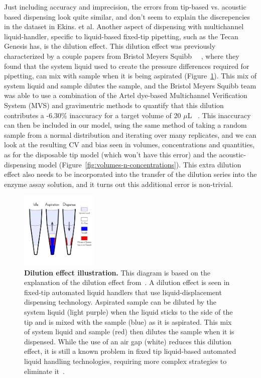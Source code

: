 \documentclass[aps,pre,twocolumn,nofootinbib,superscriptaddress,linenumbers]{revtex4-1}
\begin{document}
Just including accuracy and imprecision, the errors from tip-based vs. acoustic based dispensing look quite similar, and don't seem to explain the discrepencies in the dataset in Ekins. et al. 
Another aspect of dispensing with multichannel liquid-handler, specific to liquid-based fixed-tip pipetting, such as the Tecan Genesis has, is the dilution effect. 
This dilution effect was previously characterized by a couple papers from Bristol Meyers Squibb ~\cite{dong_use_2006}~\cite{gu_dilution_2007}, where they found that the system liquid used to create the pressure differences required for pipetting, can mix with sample when it is being aspirated (Figure~\ref{fig:dilution_effect}). 
This mix of system liquid and sample dilutes the sample, and the Bristol Meyers Squibb team was able to use a combination of the Artel dye-based Multichannel Verification System (MVS) and gravimentric methods to quantify that this dilution contributes a -6.30\% inaccuracy for a target volume of 20 $\mu$L ~\cite{dong_use_2006}.
This inaccuracy can then be included in our model, using the same method of taking a random sample from a normal distribution and iterating over many replicates, and we can look at the resulting CV and bias seen in volumes, concentrations and quantities, as for the disposable tip model (which won't have this error) and the acoustic-dispensing model (Figure~\ref{fig:volumes-n-concentrations}).
This extra dilution effect also needs to be incorporated into the transfer of the dilution series into the enzyme assay solution, and it turns out this additional error is non-trivial.

\begin{figure}[tb]
    \includegraphics[width=0.325\textwidth]{../figures/dilution_effect.pdf}

  \caption{{\bf Dilution effect illustration.}
  This diagram is based on the explanation of the dilution effect from~\cite{gu_dilution_2007}. 
  A dilution effect is seen in fixed-tip automated liquid handlers that use liquid-displacement dispensing technology. 
  Aspirated sample can be diluted by the system liquid (light purple) when the liquid sticks to the side of the tip and is mixed with the sample (blue) as it is aspirated.
  This mix of system liquid and sample (red) then dilutes the sample when it is dispensed. 
  While the use of an air gap (white) reduces this dilution effect, it is still a known problem in fixed tip liquid-based automated liquid handling technologies, requiring more complex strategies to eliminate it~\cite{gu_dilution_2007}. 
  }
  \label{fig:dilution_effect}
\end{figure}
\end{document}
